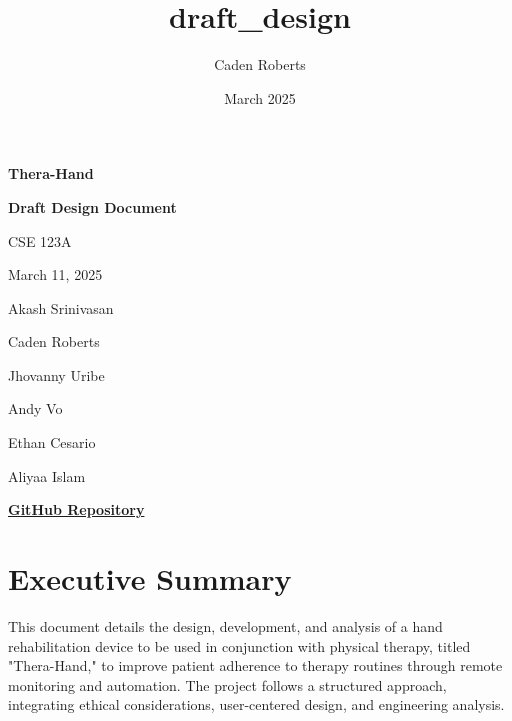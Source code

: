 \documentclass{article}
\title{draft_design}
\author{Caden Roberts}
\date{March 2025}
\begin{document}
\begin{titlepage}
    \centering
    \vspace*{4cm}

    {\Huge \bfseries Thera-Hand\par}
    \vspace{0.75cm}

    {\LARGE \bfseries Draft Design Document\par}
    \vspace{1.5cm}

    {\Large CSE 123A\par}
    \vspace{0.5cm}

    {\Large March 11, 2025\par}
    \vfill

    {\large
        Akash Srinivasan \par
        Caden Roberts \par
        Jhovanny Uribe \par
        Andy Vo \par
        Ethan Cesario \par
        Aliyaa Islam \par
    }

    \vspace{1cm}
    \href{https://github.com/jhovuribe/Physical-Therapy-Hand-Rehabilitation-Device/}{\LARGE \bfseries GitHub Repository}
    
\end{titlepage}


\section{Executive Summary}
This document details the design, development, and analysis of a hand rehabilitation device to be used in conjunction with physical therapy, titled "Thera-Hand," to improve patient adherence to therapy routines through remote monitoring and automation. The project follows a structured approach, integrating ethical considerations, user-centered design, and engineering analysis.
\end{document}
